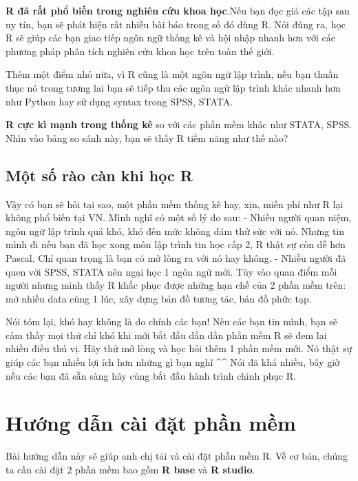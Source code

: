 \documentclass[
]{book}
\theoremstyle{definition}
\theoremstyle{definition}
\theoremstyle{definition}
\theoremstyle{definition}
\theoremstyle{remark}
\begin{document}
\textbf{R đã rất phổ biến trong nghiên cứu khoa học}.Nếu bạn đọc giả các tập san uy tín, bạn sẽ phát hiện rất nhiều bài báo trong số đó dùng R. Nói đúng ra, học R sẽ giúp các bạn giao tiếp ngôn ngữ thống kê và hội nhập nhanh hơn với các phương pháp phân tích nghiên cứu khoa học trên toàn thế giới.

Thêm một điểm nhỏ nữa, vì R cũng là một ngôn ngữ lập trình, nếu bạn thuần thục nó trong tương lai bạn sẽ tiếp thu các ngôn ngữ lập trình khác nhanh hơn như Python hay sử dụng syntax trong SPSS, STATA.

\textbf{R cực kì mạnh trong thống kê} so với các phần mềm khác như STATA, SPSS. Nhìn vào bảng so sánh này, bạn sẽ thấy R tiềm năng như thế nào?

\hypertarget{mux1ed9t-sux1ed1-ruxe0o-cuxe0n-khi-hux1ecdc-r}{%
\section{Một số rào càn khi học R}\label{mux1ed9t-sux1ed1-ruxe0o-cuxe0n-khi-hux1ecdc-r}}

Vậy có bạn sẽ hỏi tại sao, một phần mềm thống kê hay, xịn, miễn phí như R lại không phổ biến tại VN. Mình nghĩ có một số lý do sau: - Nhiều người quan niệm, ngôn ngữ lập trình quá khó, khó đến mức không dám thử sức với nó. Nhưng tin mình đi nếu bạn đã học xong môn lập trình tin học cấp 2, R thật sự còn dễ hơn Pascal. Chỉ quan trọng là bạn có mở lòng ra với nó hay không. - Nhiều người đã quen với SPSS, STATA nên ngại học 1 ngôn ngữ mới. Tùy vào quan điểm mỗi người nhưng mình thấy R khắc phục được những hạn chế của 2 phần mềm trên: mở nhiều data cùng 1 lúc, xây dựng bản đồ tương tác, bản đồ phức tạp.

Nói tóm lại, khó hay không là do chính các bạn! Nếu các bạn tin mình, bạn sẽ cảm thấy mọi thứ chỉ khó khi mới bắt đầu dần dần phần mềm R sẽ đem lại nhiều điều thú vị. Hãy thử mở lòng và học hỏi thêm 1 phần mềm mới. Nó thật sự giúp các bạn nhiều lợi ích hơn những gì bạn nghĩ \^{}\^{} Nói đã khá nhiều, bây giờ nếu các bạn đã sẵn sàng hãy cùng bắt đầu hành trình chinh phục R.

\hypertarget{hux1b0ux1edbng-dux1eabn-cuxe0i-ux111ux1eb7t-phux1ea7n-mux1ec1m}{%
\chapter{Hướng dẫn cài đặt phần mềm}\label{hux1b0ux1edbng-dux1eabn-cuxe0i-ux111ux1eb7t-phux1ea7n-mux1ec1m}}

Bài hướng dẫn này sẽ giúp anh chị tải và cài đặt phần mềm R. Về cơ bản, chúng ta cần cài đặt 2 phần mềm bao gồm \textbf{R base} và \textbf{R studio}.
\end{document}
